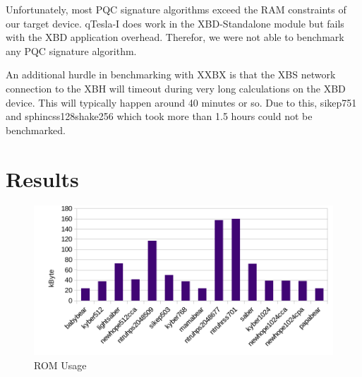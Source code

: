 \documentclass[10pt]{article}
\begin{document}
Unfortunately, most PQC signature algorithms exceed the RAM constraints of our 
target device. qTesla-I does work in the 
XBD-Standalone module but fails with the XBD application overhead. Therefor, we
were not able to benchmark any PQC signature algorithm.

An additional hurdle in benchmarking with XXBX is that 
the XBS network connection to the XBH will timeout during very long calculations on 
the XBD device. This will typically happen around 40 minutes or so.
Due to this, sikep751 and sphincss128shake256 which took more than 1.5 hours
could not be benchmarked.


\section{Results}

\begin{figure}[t]
    \centering
    \includegraphics[scale=0.8]{./figures/rom.pdf}
    \caption{ROM Usage}
    \label{fig:rom}
\end{figure}
\end{document}
